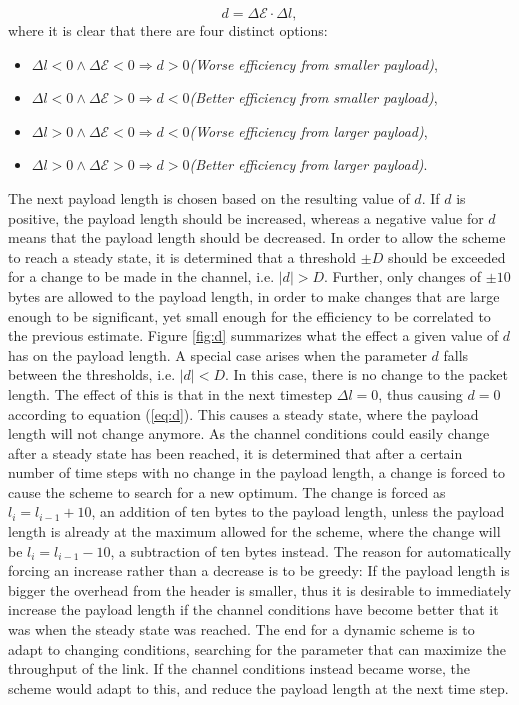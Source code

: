 \begin{equation}
d = \Delta \mathcal{E}\cdot\Delta l,\label{eq:d}
\end{equation}
where it is clear that there are four distinct options:
\begin{itemize}  
\setlength{\itemsep}{1pt}
\setlength{\parskip}{0pt}
\setlength{\parsep}{0pt}
\item[ ] $\Delta l < 0 \wedge \Delta \mathcal{E} < 0 \Rightarrow d > 0$\quad \textit{(Worse efficiency from smaller payload)},
\item[ ] $\Delta l < 0 \wedge \Delta \mathcal{E} > 0 \Rightarrow d < 0$\quad \textit{(Better efficiency from smaller payload)},
\item[ ] $\Delta l > 0 \wedge \Delta \mathcal{E} < 0 \Rightarrow d < 0$\quad \textit{(Worse efficiency from larger payload)},
\item[ ] $\Delta l > 0 \wedge \Delta \mathcal{E} > 0 \Rightarrow d > 0$\quad \textit{(Better efficiency from larger payload)}.
\end{itemize}
The next payload length is chosen based on the resulting value of $d$. If $d$ is positive, the payload length should be increased, whereas a negative value for $d$ means that the payload length should be decreased. In order to allow the scheme to reach a steady state, it is determined that a threshold $\pm D$ should be exceeded for a change to be made in the channel, i.e. $|d| > D$. Further, only changes of $\pm 10$ bytes are allowed to the payload length, in order to make changes that are large enough to be significant, yet small enough for the efficiency to be correlated to the previous estimate. Figure \ref{fig:d} summarizes what the effect a given value of $d$ has on the payload length.
A special case arises when the parameter $d$ falls between the thresholds, i.e. $|d| < D$. In this case, there is no change to the packet length. The effect of this is that in the next timestep $\Delta l= 0$, thus causing $d = 0$ according to equation (\ref{eq:d}). This causes a steady state, where the payload length will not change anymore. As the channel conditions could easily change after a steady state has been reached, it is determined that after a certain number of time steps with no change in the payload length, a change is forced to cause the scheme to search for a new optimum.
The change is forced as $l_i = l_{i-1} + 10$, an addition of ten bytes to the payload length, unless the payload length is already at the maximum allowed for the scheme, where the change will be $l_i = l_{i-1} -10$, a subtraction of ten bytes instead. The reason for automatically forcing an increase rather than a decrease is to be greedy: If the payload length is bigger the overhead from the header is smaller, thus it is desirable to immediately increase the payload length if the channel conditions have become better that it was when the steady state was reached. The end for a dynamic scheme is to adapt to changing conditions, searching for the parameter that can maximize the throughput of the link. If the channel conditions instead became worse, the scheme would adapt to this, and reduce the payload length at the next time step. 
